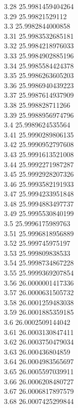 {3.28	25.9981459404264\\
3.29	25.99821529112\\
3.3	25.9982844000858\\
3.31	25.9983532685181\\
3.32	25.9984218976033\\
3.33	25.9984902885196\\
3.34	25.9985584424378\\
3.35	25.9986263605203\\
3.36	25.9986940439223\\
3.37	25.9987614937909\\
3.38	25.998828711266\\
3.39	25.9988956974796\\
3.4	25.9989624535564\\
3.41	25.9990289806135\\
3.42	25.9990952797608\\
3.43	25.9991613521008\\
3.44	25.9992271987287\\
3.45	25.9992928207326\\
3.46	25.9993582191933\\
3.47	25.9994233951848\\
3.48	25.9994883497737\\
3.49	25.9995530840199\\
3.5	25.9996175989763\\
3.51	25.9996818956889\\
3.52	25.999745975197\\
3.53	25.999809838533\\
3.54	25.9998734867228\\
3.55	25.9999369207854\\
3.56	26.0000001417336\\
3.57	26.0000631505732\\
3.58	26.0001259483038\\
3.59	26.0001885359185\\
3.6	26.0002509144042\\
3.61	26.0003130847411\\
3.62	26.0003750479034\\
3.63	26.000436804859\\
3.64	26.0004983565697\\
3.65	26.0005597039911\\
3.66	26.0006208480727\\
3.67	26.0006817897579\\
3.68	26.0007425299844\\
}
